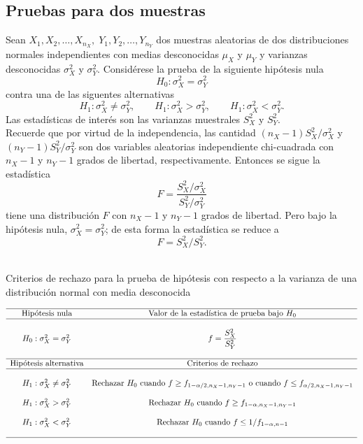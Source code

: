 \subsection{Pruebas para dos muestras}
Sean $X_1,X_2,\ldots,X_{n_X},\; Y_1,Y_2,\ldots,Y_{n_Y}$ dos muestras aleatorias de dos distribuciones normales independientes con medias desconocidas $\mu_X$ y $\mu_Y$ y varianzas desconocidas $\sigma_X^2$ y $\sigma_Y^2$. Considérese la prueba de la siguiente hipótesis nula
$$H_0:\sigma_X^2=\sigma_Y^2$$
contra una de las siguentes alternativas
$$H_1:\sigma_X^2\neq \sigma_Y^2,\qquad H_1:\sigma_X^2>\sigma_Y^2,\qquad H_1:\sigma_X^2<\sigma_Y^2.$$
Las estadísticas de interés son las varianzas muestrales $S_X^2$ y $S_Y^2$. \\

Recuerde que por virtud de la independencia, las cantidad $(n_X-1)S_X^2/\sigma_X^2$ y $(n_Y-1)S_Y^2/\sigma_Y^2$ son dos variables aleatorias independiente chi-cuadrada con $n_X-1$ y $n_Y-1$ grados de libertad, respectivamente. Entonces se sigue la estadística
$$F=\dfrac{S_X^2/\sigma_X^2}{S_Y^2/\sigma_Y^2}$$
tiene una distribución $F$ con $n_X-1$ y $n_Y-1$ grados de libertad. Pero bajo la hipótesis nula, $\sigma_X^2=\sigma_Y^2$; de esta forma la estadística se reduce a 
$$F=S_X^2/S_Y^2.$$\\

\begin{center}
    Criterios de rechazo para la prueba de hipótesis con respecto a la varianza de una distribución normal con media desconocida
\end{center}
$$
\begin{array}{cc}
    \hline
    \mbox{Hipótesis nula} & \mbox{Valor de la estadística de prueba bajo } H_0\\
    \hline\\
    H_0: \sigma_X^2=\sigma_Y^2 & f=\dfrac{S_X^2}{S_Y^2}\\\\
    \hline
    \mbox{Hipótesis alternativa} & \mbox{Criterios de rechazo}\\
    \hline\\
    H_1:\sigma_X^2\neq \sigma_Y^2 & \mbox{Rechazar } H_0 \mbox{ cuando } f\geq f_{1-\alpha/2,n_X-1,n_Y-1} \mbox{ o cuando } f\leq f_{\alpha/2,n_X-1,n_Y-1}\\\\
    H_1:\sigma_X^2>\sigma_Y^2 & \mbox{Rechazar } H_0 \mbox{ cuando } f\geq f_{1-\alpha,n_X-1,n_Y-1}\\\\
    H_1:\sigma_X^2<\sigma_Y^2 & \mbox{Rechazar } H_0 \mbox{ cuando } f \leq 1/f_{1-\alpha,n-1}\\\\
    \hline
\end{array}
$$


